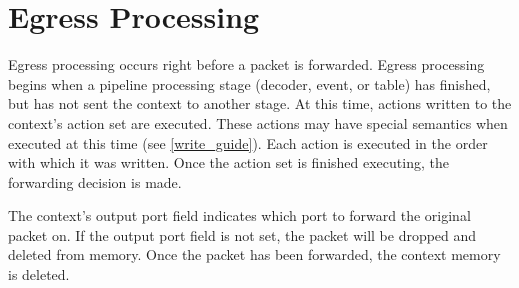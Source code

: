 \section{Egress Processing} \label{egress_process}

Egress processing occurs right before a packet is forwarded. Egress processing begins when a pipeline processing stage (decoder, event, or table) has finished, but has not sent the context to another stage. At this time, actions written to the context's action set are executed. These actions may have special semantics when executed at this time (see \ref{write_guide}). Each action is executed in the order with which it was written. Once the action set is finished executing, the forwarding decision is made.

The context's output port field indicates which port to forward the original packet on. If the output port field is not set, the packet will be dropped and deleted from memory. Once the packet has been forwarded, the context memory is deleted. 